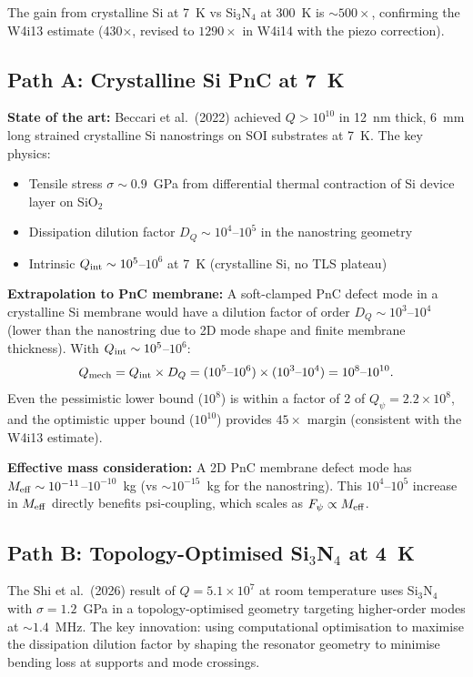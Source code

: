 \documentclass[11pt]{article}
\theoremstyle{definition}
\theoremstyle{remark}
\newcommand{\ee}[1]{\times 10^{#1}}
\newcommand{\Qpsi}{Q_\psi}
\newcommand{\Qmech}{Q_{\rm mech}}
\begin{document}
The gain from crystalline Si at 7~K vs Si$_3$N$_4$ at 300~K
is $\sim 500\times$, confirming the W4i13 estimate (430$\times$,
revised to $1290\times$ in W4i14 with the piezo correction).

\subsection{Path A: Crystalline Si PnC at 7~K}

\textbf{State of the art:} Beccari et al.\ (2022) achieved
$Q > 10^{10}$ in 12~nm thick, 6~mm long strained crystalline Si
nanostrings on SOI substrates at 7~K. The key physics:
\begin{itemize}[nosep]
\item Tensile stress $\sigma \sim 0.9$~GPa from differential
  thermal contraction of Si device layer on SiO$_2$
\item Dissipation dilution factor $D_Q \sim 10^4$--$10^5$ in
  the nanostring geometry
\item Intrinsic $Q_{\rm int} \sim 10^5$--$10^6$ at 7~K
  (crystalline Si, no TLS plateau)
\end{itemize}

\textbf{Extrapolation to PnC membrane:}
A soft-clamped PnC defect mode in a crystalline Si membrane
would have a dilution factor of order $D_Q \sim 10^3$--$10^4$
(lower than the nanostring due to 2D mode shape and finite
membrane thickness). With $Q_{\rm int} \sim 10^5$--$10^6$:
\begin{equation}
\Qmech = Q_{\rm int} \times D_Q = (10^5\text{--}10^6) \times
(10^3\text{--}10^4) = 10^8\text{--}10^{10}.
\label{eq:cryo_si_pnc}
\end{equation}
Even the pessimistic lower bound ($10^8$) is within a factor of
2 of $\Qpsi = 2.2\ee{8}$, and the optimistic upper bound
($10^{10}$) provides $45\times$ margin (consistent with the W4i13
estimate).

\textbf{Effective mass consideration:} A 2D PnC membrane defect
mode has $M_{\rm eff} \sim 10^{-11}$--$10^{-10}$~kg (vs
$\sim 10^{-15}$~kg for the nanostring). This $10^4$--$10^5$
increase in $M_{\rm eff}$ directly benefits psi-coupling, which
scales as $F_\psi \propto M_{\rm eff}$.

\subsection{Path B: Topology-Optimised Si$_3$N$_4$ at 4~K}

The Shi et al.\ (2026) result of $Q = 5.1\ee{7}$ at room
temperature uses Si$_3$N$_4$ with $\sigma = 1.2$~GPa in a
topology-optimised geometry targeting higher-order modes at
$\sim 1.4$~MHz. The key innovation: using computational
optimisation to maximise the dissipation dilution factor by
shaping the resonator geometry to minimise bending loss at
supports and mode crossings.
\end{document}
